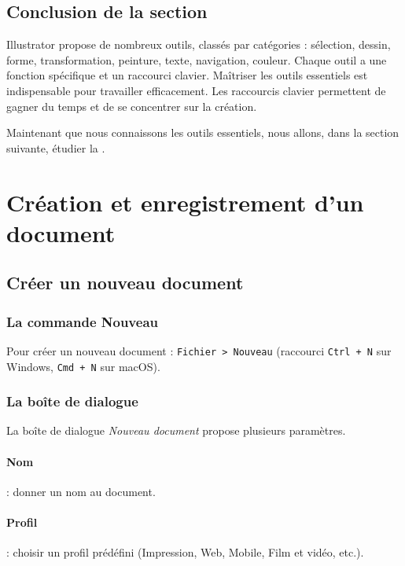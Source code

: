 \subsection*{Conclusion de la section}

Illustrator propose de nombreux outils, classés par catégories : sélection, dessin, forme, transformation, peinture, texte, navigation, couleur. Chaque outil a une fonction spécifique et un raccourci clavier. Maîtriser les outils essentiels est indispensable pour travailler efficacement. Les raccourcis clavier permettent de gagner du temps et de se concentrer sur la création.

Maintenant que nous connaissons les outils essentiels, nous allons, dans la section suivante, étudier la .

\section{Création et enregistrement d'un document}

\subsection{Créer un nouveau document}

\subsubsection{La commande Nouveau}

Pour créer un nouveau document : \texttt{Fichier > Nouveau} (raccourci \texttt{Ctrl + N} sur Windows, \texttt{Cmd + N} sur macOS).

\subsubsection{La boîte de dialogue}

La boîte de dialogue \emph{Nouveau document} propose plusieurs paramètres.

\paragraph{Nom} : donner un nom au document.

\paragraph{Profil} : choisir un profil prédéfini (Impression, Web, Mobile, Film et vidéo, etc.).

